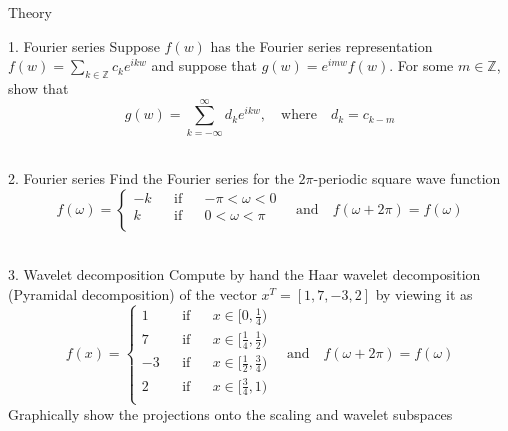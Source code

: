 \begin{section}{Theory}

\begin{homeworkSection}{1. Fourier series}
Suppose $f(w)$ has the Fourier series representation $f(w) = \sum_{k \in \mathbb{Z}} c_k e^{ikw}$ and suppose that $g(w) = e^{imw}f(w)$. For some $m \in \mathbb{Z}$, show that
$$
	g(w) = \sum_{k = -\infty}^{\infty} d_k e^{ikw}, \quad \text{where} \quad d_k = c_{k-m}
$$
\\
\problemAnswer{
}
\end{homeworkSection}

\begin{homeworkSection}{2. Fourier series}
Find the Fourier series for the $2\pi$-periodic square wave function 
$$
	f(\omega) = \left \lbrace \begin{matrix} -k && \text{if} && -\pi < \omega < 0\\
		k && \text{if} && 0 < \omega < \pi \\
	 \end{matrix} \right.
	\quad \text{and} \quad f(\omega + 2\pi) = f(\omega)
$$
\\
\problemAnswer{
}
\end{homeworkSection}

\begin{homeworkSection}{3. Wavelet decomposition}
Compute by hand the Haar wavelet decomposition (Pyramidal decomposition) of the vector $x^T = [1,7,−3,2]$ by viewing it as
$$
	f(x) = \left \lbrace 
	\begin{matrix} 
		1 && \text{if} && x \in [0,\frac{1}{4}) \\
		7 && \text{if} && x \in [\frac{1}{4}, \frac{1}{2}) \\
		-3 && \text{if} && x \in [\frac{1}{2},\frac{3}{4}) \\
		2 && \text{if} && x \in [\frac{3}{4},1) \\
	 \end{matrix} \right.
	\quad \text{and} \quad f(\omega + 2\pi) = f(\omega)
$$
Graphically show the projections onto the scaling and wavelet subspaces
\\
\\
\problemAnswer{ 
}
\end{homeworkSection}

\end{section}


